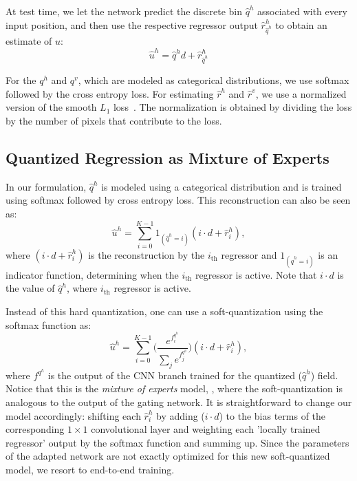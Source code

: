 At test time, we let the network predict the discrete bin $\hat{q}^h$ associated with every input position, and then use the respective regressor output $\hat{r}^h_{\hat{q}^h}$ to obtain an estimate of $u$:
\begin{equation}   
\hat{u}^h =  \hat{q}^h d + \hat{r}^h_{\hat{q}^h}
\end{equation}

For the $q^h$ and $q^v$, which are modeled as categorical distributions,  we use  softmax followed by the cross entropy loss. For estimating $\hat{r}^h$ and $\hat{r}^v$, we use a normalized version of the smooth $L_1$ loss~\cite{girshick2015fast}. The normalization is obtained by dividing the loss by the number of pixels that contribute to the loss.


\subsection{Quantized Regression as Mixture of Experts}
\label{sec:MOE}

In our formulation,  $\hat{q}^h$ is modeled using a categorical distribution and is trained using softmax followed by cross entropy loss. This reconstruction can also be seen as:
\begin{equation}
\hat{u}^h = \sum_{i=0}^{K-1}  1_{(\hat{q}^h=i)}  (  i \cdot d + \hat{r}^h_{i}),
\end{equation}
where $(  i \cdot d + \hat{r}^h_{i})$ is the reconstruction by the $i_{\mathrm{th}}$ regressor and $1_{(\hat{q}^h=i)}$ is an indicator function, determining when the $i_{\mathrm{th}}$ regressor is active. Note that $i \cdot d$ is the value of $\hat{q}^h$, where $i_{\mathrm{th}}$ regressor is active.

Instead of this hard quantization, one can use a soft-quantization using the softmax function as:
\begin{equation}
\hat{u}^h = \sum_{i=0}^{K-1}  \bigg( \frac{e^{f^{q^h}_i}}{\sum_j e^{f^{q^h}_j}}   \bigg)  ( i \cdot d + \hat{r}^h_{i}),
\end{equation}
where $f^{q^h}$ is the output of the CNN branch trained for the quantized ($\hat{q}^h$) field. Notice that this is the \textit{mixture of experts} model, \cite{JordanJ94}, where the soft-quantization is analogous to the output of the gating network. It is straightforward to change our model accordingly: shifting each $\hat{r}^h_{i}$ by adding ($i \cdot d$) to the bias terms of the corresponding $1\times1$  convolutional layer and weighting each 'locally trained regressor' output by the softmax function and summing up. Since the parameters of the adapted network are not exactly optimized for this new soft-quantized model, we resort to end-to-end training. 

